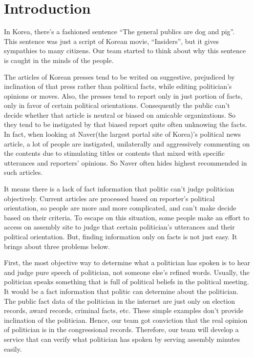 \documentclass[conference]{IEEEtran}
\begin{document}
\vspace{5mm}

\section{Introduction}
In Korea, there’s a fashioned sentence “The general publics are dog and pig”. This sentence was just a script of Korean movie, “Insiders”, but it gives sympathies to many citizens. Our team started to think about why this sentence is caught in the minds of the people.

The articles of Korean presses tend to be writed on suggestive, prejudiced by inclination of that press rather than political facts, while editing politician’s opinions or moves. Also, the presses tend to report only in just portion of facts, only in favor of certain political orientations. Consequently the public can’t decide whether that article is neutral or biased on amicable organizations. So they tend to be instigated by that biased report quite often unknowing the facts. In fact, when looking at Naver(the largest portal site of Korea)’s political news article, a lot of people are instigated, unilaterally and aggressively commenting on the contents due to stimulating titles or contents that mixed with specific utterances and reporters' opinions. So Naver often hides highest recommended in such articles.

It means there is a lack of fact information that politic can’t judge politician objectively. Current articles are processed based on reporter’s political orientation, so people are more and more complicated, and can’t make decide based on their criteria. To escape on this situation, some people make an effort to access on assembly site to judge that certain politician’s utterances and their political orientation. But, finding information only on facts is not just easy. It brings about three problems below.

First, the most objective way to determine what a politician has spoken is to hear and judge pure speech of politician, not someone else’s refined words. Usually, the politician speaks something that is full of political beliefs in the political meeting. It would be a fact information that politic can determine about the politician. The public fact data of the politician in the internet are just only on election records, award records, criminal facts, etc. These simple examples don’t provide inclination of the politician. Hence, our team got conviction that the real opinion of politician is in the congressional records. Therefore, our team will develop a service that can verify what politician has spoken by serving  assembly minutes easily.
\end{document}
